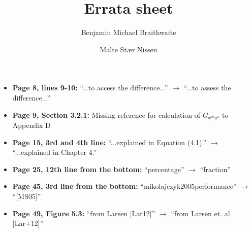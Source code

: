 \documentclass[a4paper,11pt]{article}
\title{\textbf{Errata sheet}}
\author{Benjamin Michael Braithwaite \\ \and Malte Stær Nissen}
\begin{document}
\maketitle

\begin{itemize}
\item{\textbf{Page 8, lines 9-10:} ``...to access the difference...'' $\rightarrow$ ``...to assess the difference...''}
\item{\textbf{Page 9, Section 3.2.1:} Missing reference for calculation of $G_{x^m y^n}$ to Appendix D}
\item{\textbf{Page 15, 3rd and 4th line:} ``...explained in Equation (4.1).'' $\rightarrow$ ``...explained in Chapter 4.''}
\item{\textbf{Page 25, 12th line from the bottom:} ``percentage'' $\rightarrow$ ``fraction''}
\item{\textbf{Page 45, 3rd line from the bottom:} ``mikolajczyk2005performance'' $\rightarrow$ ``[MS05]''}
\item{\textbf{Page 49, Figure 5.3:} ``from Larsen [Lar12]'' $\rightarrow$ ``from Larsen et. al [Lar+12]''}
\end{itemize}
\end{document}
